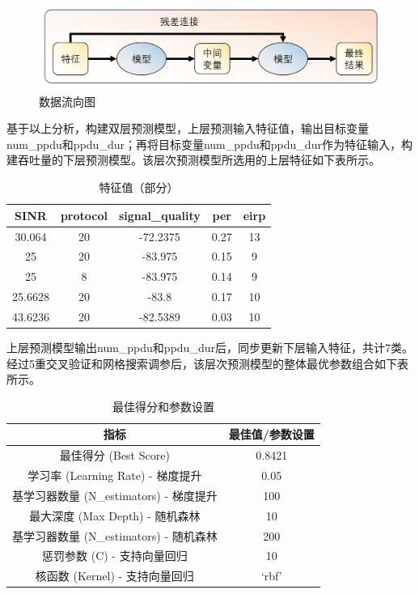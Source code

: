 \documentclass[bwprint]{gmcmthesis}
\begin{document}
\begin{figure}[H]
	\centering
	\includegraphics[width=0.7\linewidth]{figures/问题三流程}
	\caption{数据流向图}
	\label{fig:}
\end{figure}



基于以上分析，构建双层预测模型，上层预测输入特征值，输出目标变量num\_ppdu和ppdu\_dur；再将目标变量num\_ppdu和ppdu\_dur作为特征输入，构建吞吐量的下层预测模型。该层次预测模型所选用的上层特征如下表所示。

\begin{table}[H]
	\centering
	\caption{特征值（部分）}
	\begin{tabular}{ccccc} %
		\toprule
		SINR & protocol & signal\_quality &  per & eirp\\ 
		\midrule
		30.064 & 20 & -72.2375 &  0.27 & 13 \\
		25 & 20 & -83.975 &  0.15 & 9 \\
		25 & 8 & -83.975 &  0.14 & 9 \\
		25.6628 & 20 & -83.8 &  0.17 & 10 \\
		43.6236 & 20 & -82.5389 &  0.03 & 10 \\
		\bottomrule
	\end{tabular}
\end{table}

上层预测模型输出num\_ppdu和ppdu\_dur后，同步更新下层输入特征，共计7类。经过5重交叉验证和网格搜索调参后，该层次预测模型的整体最优参数组合如下表所示。


\begin{table}[H]
	\centering
	\caption{最佳得分和参数设置}
	\begin{tabular}{cc}
		\toprule
		指标 & 最佳值/参数设置 \\
		\midrule
		最佳得分 (Best Score) & 0.8421 \\
		学习率 (Learning Rate) - 梯度提升 & 0.05 \\
		基学习器数量 (N\_estimators) - 梯度提升 & 100 \\
		最大深度 (Max Depth) - 随机森林 & 10 \\
		基学习器数量 (N\_estimators) - 随机森林 & 200 \\
		惩罚参数 (C) - 支持向量回归 & 10 \\
		核函数 (Kernel) - 支持向量回归 & `rbf' \\
		\bottomrule
	\end{tabular}
\end{table}
\end{document}

